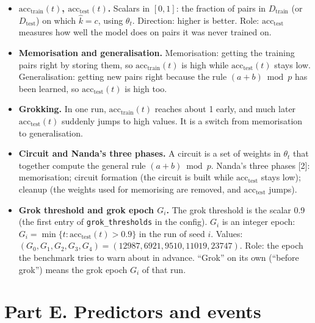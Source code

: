\documentclass[11pt,a4paper,oneside,openany]{report}
\newcommand{\acctest}{\mathrm{acc}_{\mathrm{test}}}
\newcommand{\acctrain}{\mathrm{acc}_{\mathrm{train}}}
\newcommand{\Dtrain}{D_{\mathrm{train}}}
\newcommand{\Dtest}{D_{\mathrm{test}}}
\newcommand{\code}[1]{\texttt{#1}}
\newcommand{\gl}[1]{\textbf{#1}}   %
\newenvironment{glist}{\begin{itemize}\setlength{\itemsep}{2pt}\setlength{\parskip}{1pt}}{\end{itemize}}
\begin{document}
\begin{glist}
\item[\gl{N23}] \textbf{$\acctrain(t)$, $\acctest(t)$.} Scalars in $[0, 1]$: the fraction of pairs in $\Dtrain$ (or $\Dtest$) on which $\hat k = c$, using $\theta_t$. Direction: higher is better. Role: $\acctest$ measures how well the model does on pairs it was never trained on.
\item[\gl{N24}] \textbf{Memorisation and generalisation.} Memorisation: getting the training pairs right by storing them, so $\acctrain(t)$ is high while $\acctest(t)$ stays low. Generalisation: getting new pairs right because the rule $(a + b) \bmod p$ has been learned, so $\acctest(t)$ is high too.
\item[\gl{N25}] \textbf{Grokking.} In one run, $\acctrain(t)$ reaches about 1 early, and much later $\acctest(t)$ suddenly jumps to high values. It is a switch from memorisation to generalisation.
\item[\gl{N26}] \textbf{Circuit and Nanda's three phases.} A circuit is a set of weights in $\theta_t$ that together compute the general rule $(a+b) \bmod p$. Nanda's three phases [2]: memorisation; circuit formation (the circuit is built while $\acctest$ stays low); cleanup (the weights used for memorising are removed, and $\acctest$ jumps).
\item[\gl{N27}] \textbf{Grok threshold and grok epoch $G_i$.} The grok threshold is the scalar 0.9 (the first entry of \code{grok\_\allowbreak{}thresholds} in the config). $G_i$ is an integer epoch: $G_i = \min\{t : \acctest(t) > 0.9\}$ in the run of seed $i$. Values: $(G_0, G_1, G_2, G_3, G_4) = (12987, 6921, 9510, 11019, 23747)$. Role: the epoch the benchmark tries to warn about in advance. ``Grok'' on its own (``before grok'') means the grok epoch $G_i$ of that run.
\end{glist}

\section*{Part E. Predictors and events}
\end{document}
